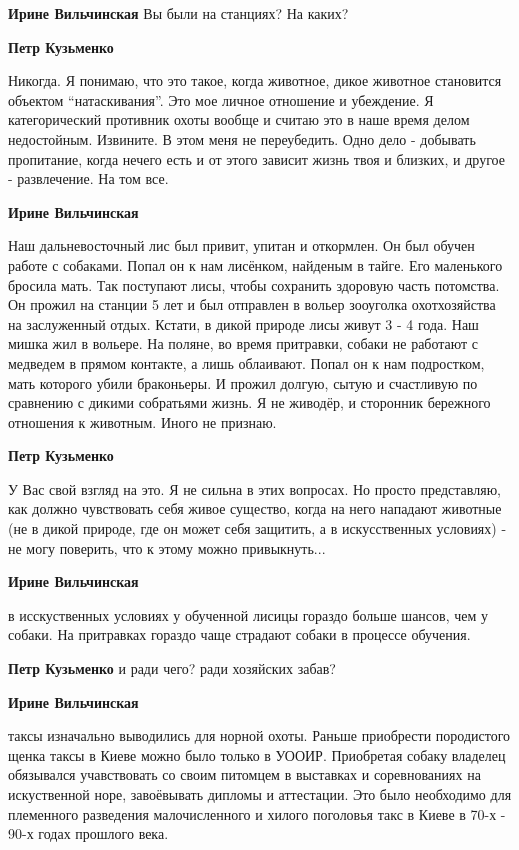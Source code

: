 \begin{itemize}
\begin{itemize} %
\textbf{Ирине Вильчинская} Вы были на станциях? На каких?

\textbf{Петр Кузьменко} 

Никогда. Я понимаю, что это такое, когда животное, дикое животное становится
объектом \enquote{натаскивания}. Это мое личное отношение и убеждение. Я категорический
противник охоты вообще и считаю это в наше время делом недостойным. Извините. В
этом меня не переубедить. Одно дело - добывать пропитание, когда нечего есть и от
этого зависит жизнь твоя и близких, и другое - развлечение. На том все.

\textbf{Ирине Вильчинская} 

Наш дальневосточный лис был привит, упитан и откормлен. Он был обучен работе с
собаками. Попал он к нам лисёнком, найденым в тайге. Его маленького бросила
мать. Так поступают лисы, чтобы сохранить здоровую часть потомства. Он прожил
на станции 5 лет и был отправлен в вольер зооуголка охотхозяйства на
заслуженный отдых. Кстати, в дикой природе лисы живут 3 - 4 года. Наш мишка жил
в вольере. На поляне, во время притравки, собаки не работают с медведем в
прямом контакте, а лишь облаивают. Попал он к нам подростком, мать которого
убили браконьеры. И прожил долгую, сытую и счастливую по сравнению с дикими
собратьями жизнь. Я не живодёр, и сторонник бережного отношения к животным.
Иного не признаю.

\textbf{Петр Кузьменко} 

У Вас свой взгляд на это. Я не сильна в этих вопросах. Но просто представляю,
как должно чувствовать себя живое существо, когда на него нападают животные (не
в дикой природе, где он может себя защитить, а в искусственных условиях) - не
могу поверить, что к этому можно привыкнуть...

\textbf{Ирине Вильчинская} 

в исскуственных условиях у обученной лисицы гораздо больше шансов, чем у
собаки. На притравках гораздо чаще страдают собаки в процессе обучения.

\textbf{Петр Кузьменко} и ради чего? ради хозяйских забав?

\textbf{Ирине Вильчинская} 

таксы изначально выводились для норной охоты. Раньше приобрести породистого
щенка таксы в Киеве можно было только в УООИР. Приобретая собаку владелец
обязывался учавствовать со своим питомцем в выставках и соревнованиях на
искуственной норе, завоёвывать дипломы и аттестации. Это было необходимо для
племенного разведения малочисленного и хилого поголовья такс в Киеве в 70-х -
90-х годах прошлого века.


\end{itemize}
\end{itemize}
